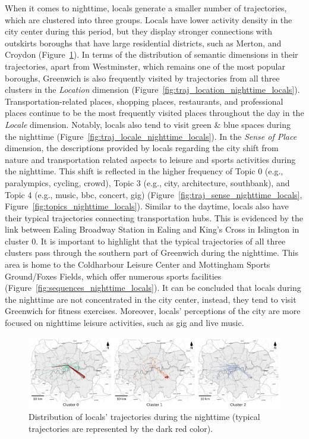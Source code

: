 \documentclass{article}
\theoremstyle{definition}
\theoremstyle{remark}
\begin{document}
When it comes to nighttime, locals generate a smaller number of trajectories, which are clustered into three groups. Locals have lower activity density in the city center during this period, but they display stronger connections with outskirts boroughs that have large residential districts, such as Merton, and Croydon (Figure~\ref{fig:traj_distribution_nighttime_locals}). In terms of the distribution of semantic dimensions in their trajectories, apart from Westminster, which remains one of the most popular boroughs, Greenwich is also frequently visited by trajectories from all three clusters in the \textit{Location} dimension (Figure~\ref{fig:traj_location_nighttime_locals}). Transportation-related places, shopping places, restaurants, and professional places continue to be the most frequently visited places throughout the day in the \textit{Locale} dimension. Notably, locals also tend to visit green \& blue spaces during the nighttime (Figure~\ref{fig:traj_locale_nighttime_locals}). In the \textit{Sense of Place} dimension, the descriptions provided by locals regarding the city shift from nature and transportation related aspects to leisure and sports activities during the nighttime. This shift is reflected in the higher frequency of Topic 0 (e.g., paralympics, cycling, crowd), Topic 3 (e.g., city, architecture, southbank), and Topic 4 (e.g., music, bbc, concert, gig) (Figure~\ref{fig:traj_sense_nighttime_locals}, Figure~\ref{fig:topics_nighttime_locals}). Similar to the daytime, locals also have their typical trajectories connecting transportation hubs. This is evidenced by the link between Ealing Broadway Station in Ealing and King's Cross in Islington in cluster 0. It is important to highlight that the typical trajectories of all three clusters pass through the southern part of Greenwich during the nighttime. This area is home to the Coldharbour Leisure Center and Mottingham Sports Ground/Foxes Fields, which offer numerous sports facilities (Figure~\ref{fig:sequences_nighttime_locals}). It can be concluded that locals during the nighttime are not concentrated in the city center, instead, they tend to visit Greenwich for fitness exercises. Moreover, locals' perceptions of the city are more focused on nighttime leisure activities, such as gig and live music.

\begin{figure}[!h]
\centering
\includegraphics[width=1\textwidth]{figures/traj_distribution_nighttime_locals.png}
\caption{\label{fig:traj_distribution_nighttime_locals}Distribution of locals' trajectories during the nighttime (typical trajectories are represented by the dark red color).}
\end{figure}
\end{document}
